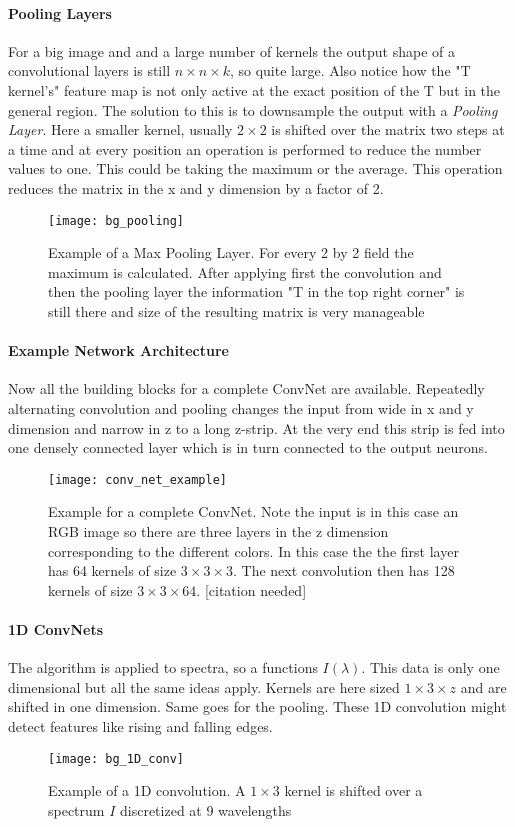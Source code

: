 \paragraph{Pooling Layers}
For a big image and and a large number of kernels the output shape of a convolutional layers is still $n \times n \times k$, so quite large. Also notice how the "T kernel's" feature map is not only active at the exact position of the T but in the general region. The solution to this is to downsample the output with a \textit{Pooling Layer}. Here a smaller kernel, usually $2 \times 2$ is shifted over the matrix two steps at a time and at every position an operation is performed to reduce the number values to one. This could be taking the maximum or the average. This operation reduces the matrix in the x and y dimension by a factor of 2.

\begin{figure}[H]
    \centering
    \texttt{[image: bg\_pooling]}
    \caption{Example of a Max Pooling Layer. For every 2 by 2 field the maximum is calculated. After applying first the convolution and then the pooling layer the information "T in the top right corner" is still there and size of the resulting matrix is very manageable}
    \label{fig:bg:pooling}
\end{figure}

\paragraph{Example Network Architecture}
Now all the building blocks for a complete ConvNet are available. Repeatedly alternating convolution and pooling changes the input from wide in x and y dimension and narrow in z to a long z-strip. At the very end this strip is fed into one densely connected layer which is in turn connected to the output neurons.

\begin{figure}[H]
    \centering
    \texttt{[image: conv\_net\_example]}
    \caption{Example for a complete ConvNet. Note the input is in this case an RGB image so there are three layers in the z dimension corresponding to the different colors. In this case the the first layer has 64 kernels of size $3 \times 3 \times 3$. The next convolution then has 128 kernels of size $3 \times 3 \times 64$. [citation needed]}
    \label{}
\end{figure}

\paragraph{1D ConvNets}
The algorithm is applied to spectra, so a functions $I(\lambda)$. This data is only one dimensional but all the same ideas apply. Kernels are here sized $1 \times 3 \times z$ and are shifted in one dimension. Same goes for the pooling. These 1D convolution might detect features like rising and falling edges.

\begin{figure}[H]
    \centering
    \texttt{[image: bg\_1D\_conv]}
    \caption{Example of a 1D convolution. A $1 \times 3$ kernel is shifted over a spectrum $I$ discretized at 9 wavelengths}
    \label{fig:bg:1D_conv}
\end{figure}
